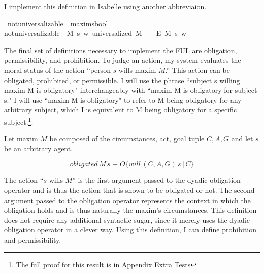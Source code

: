 \begin{isabellebody}
\begin{isamarkuptext}
I implement this definition in Isabelle using another abbreviaion.%
\end{isamarkuptext}\isamarkuptrue%
\isamarkupfalse%
\ not{\isacharunderscore}universalizable\ {\isacharcolon}{\isacharcolon}\ {\isachardoublequoteopen}maxim{\isasymRightarrow}s{\isasymRightarrow}bool{\isachardoublequoteclose}\ \ \isanewline
{\isachardoublequoteopen}not{\isacharunderscore}universalizable\ {\isasymequiv}\ {\isasymlambda}M\ s{\isachardot}\ {\isasymforall}w{\isachardot}\ {\isacharparenleft}{\isacharparenleft}universalized\ M{\isacharparenright}\ \ \isactrlbold {\isasymrightarrow}\ {\isacharparenleft}\isactrlbold {\isasymnot}\ {\isacharparenleft}E\ M\ s{\isacharparenright}{\isacharparenright}{\isacharparenright}\ w{\isachardoublequoteclose}\isanewline
%
%
\begin{isamarkuptext}%
The final set of definitions necessary to implement the FUL are obligation, permissibility, 
and prohibition. To judge an action, my system evaluates the moral status of the action 
``person $s$ wills maxim $M$.'' This action can be obligated, prohibited, or permissible.
I will use the phrase ``subject s willing maxim M is obligatory" 
interchangeably with ``maxim M is obligatory for subject s." I will use ``maxim M is obligatory" to 
refer to M being obligatory for any arbitrary subject, which I is equivalent to M being 
obligatory for a specific subject.\footnote{The full proof for this result is in Appendix Extra Tests}. 

\begin{definition}[Obligation]

Let maxim $M$ be composed of the circumstances, act, goal tuple $C, A, G$ and let $s$ be an arbitrary agent.

$$obligated \, M \, s \equiv O\{ will \, (C, A, G) \, s \, | \, C\}$$

\end{definition}

The action ``$s$ wills $M$'' is the first argument passed to the dyadic obligation operator and is 
thus the action that is shown to be obligated or not. The second argument passed to the obligation 
operator represents the context in which the obligation holds and is thus naturally the maxim's circumstances.
This definition does not require any additional syntactic sugar, since it merely uses the dyadic obligation
operator in a clever way. Using this definition, I can define prohibition and permissibility.


\end{isamarkuptext}
\end{isabellebody}
